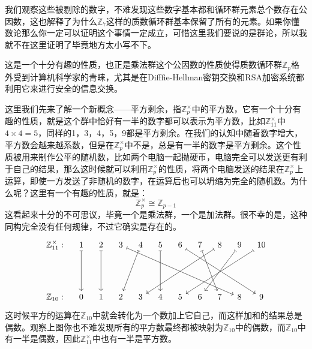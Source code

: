 \documentclass[UTF8]{ctexbook}
\begin{document}
\begin{figure}[H]
\end{figure}
我们观察这些被剔除的数字，不难发现这些数字基本都和循环群元素总个数存在公因数，这也解释了为什么$\mathbb{Z}_7$这样的质数循环群基本保留了所有的元素。如果你懂数论那么你一定可以证明这个事情一定成立，可惜这里我们要说的是群论，所以我就不在这里证明了毕竟地方太小写不下。

这是一个十分有趣的性质，也正是乘法群这个公因数的性质使得质数循环群$\mathbb{Z}_p$格外受到计算机科学家的青睐，尤其是在Difffie-Hellman密钥交换和RSA加密系统都利用它来进行安全的信息交换。

这里我们先来了解一个新概念——平方剩余，指$\mathbb{Z}_p^{\times}$中的平方数，它有一个十分有趣的性质，就是这个群中恰好有一半的数字都可以表示为平方数，比如$\mathbb{Z}_{11}^{\times}$中$4\times4=5$，同样的1，3，4，5，9都是平方剩余。在我们的认知中随着数字增大，平方数会越来越系数，但是在$\mathbb{Z}_p^{\times}$中不是，总是有一半的数字是平方剩余。这个性质被用来制作公平的随机数，比如两个电脑一起抛硬币，电脑完全可以发送更有利于自己的结果，那么这时候就可以利用$\mathbb{Z}_p^{\times}$的性质，将两个电脑发送的结果在$\mathbb{Z}_p^{\times}$上运算，即使一方发送了非随机的数字，在运算后也可以坍缩为完全的随机数。为什么呢？这里有一个有趣的性质，就是：
\[
\mathbb{Z}_p^{\times} \cong \mathbb{Z}_{p-1}
\]
这看起来十分的不可思议，毕竟一个是乘法群，一个是加法群。很不幸的是，这种同构完全没有任何规律，不过它确实是存在的。
\[
\begin{tikzcd}[column sep=1em, row sep=4.5em]
\mathbb{Z}_{11}^{\times}:
& 1 \arrow[d,mapsto]
& 2 \arrow[d,mapsto]
& 3 \arrow[drrrrrr,mapsto]
& 4 \arrow[dl,mapsto]
& 5 \arrow[d,mapsto]
& 6 \arrow[drrrr,mapsto]
& 7 \arrow[dr,mapsto]
& 8 \arrow[dllll,mapsto]
& 9 \arrow[dll,mapsto]
& 10 \arrow[dllll,mapsto]
\\
\mathbb{Z}_{10}:
& 0 
& 1 
& 2
& 3 
& 4 
& 5
& 6
& 7
& 8
& 9
\end{tikzcd}
\]
这时候平方的运算在$\mathbb{Z}_{10}$中就会转化为一个数加上它自己，而这样加和的结果总是偶数。观察上图你也不难发现所有的平方数最终都被映射为$\mathbb{Z}_{10}$中的偶数，而$\mathbb{Z}_{10}$中有一半是偶数，因此$\mathbb{Z}_{11}^{\times}$中也有一半是平方数。
\end{document}
